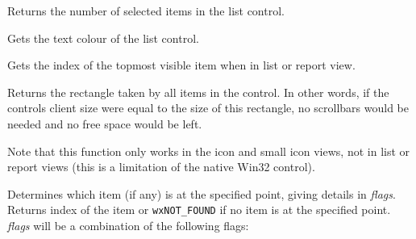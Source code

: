 \label{wxlistctrlgetselecteditemcount}


Returns the number of selected items in the list control.


\label{wxlistctrlgettextcolour}


Gets the text colour of the list control.


\label{wxlistctrlgettopitem}


Gets the index of the topmost visible item when in
list or report view.



\label{wxlistctrlgetviewrect}


Returns the rectangle taken by all items in the control. In other words, if the
controls client size were equal to the size of this rectangle, no scrollbars
would be needed and no free space would be left.

Note that this function only works in the icon and small icon views, not in
list or report views (this is a limitation of the native Win32 control).



\label{wxlistctrlhittest}


Determines which item (if any) is at the specified point,
giving details in {\it flags}. Returns index of the item or {\tt wxNOT\_FOUND}
if no item is at the specified point.
{\it flags} will be a combination of the following flags:

\twocolwidtha{5cm}
\begin{twocollist}\itemsep=0pt
\end{twocollist}

